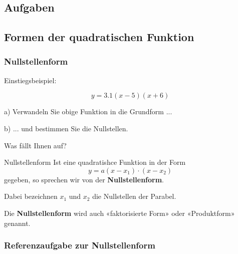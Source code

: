 \subsection*{Aufgaben}

\newpage

\subsection{Formen der quadratischen Funktion}
\subsubsection{Nullstellenform}

Einstiegsbeispiel:


$$y = 3.1(x-5)(x+6)$$

a) Verwandeln Sie obige Funktion in die Grundform ...


b) ... und bestimmen Sie die Nullstellen.


Was fällt Ihnen auf?




\newpage

\begin{gesetz}{Nullstellenform}{}
Ist eine quadratishce Funktion in der Form
$$y = a(x-x_1)\cdot{}(x-x_2)$$
gegeben, so sprechen wir von der \textbf{Nullstellenform}.

Dabei bezeichnen  $x_1$ und $x_2$ die Nullstellen der Parabel.
  \end{gesetz}



Die \textbf{Nullstellenform} wird auch  «faktorisierte Form» oder
«Produktform» genannt.


\newpage


\subsubsection*{Referenzaufgabe zur Nullstellenform}


